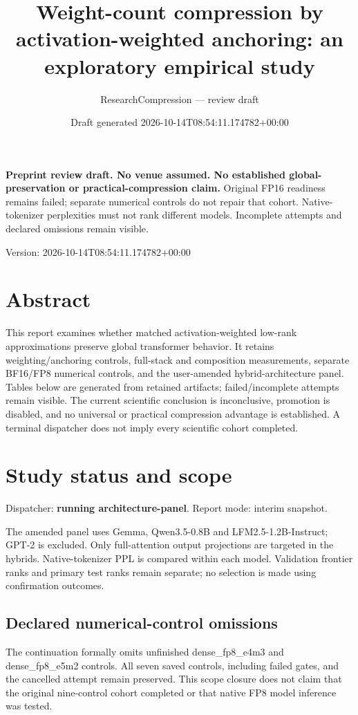 \documentclass[10pt]{article}
\title{Weight-count compression by activation-weighted anchoring: an exploratory empirical study}
\author{ResearchCompression --- review draft}
\date{Draft generated 2026-10-14T08:54:11.174782+00:00}
\begin{document}
\maketitle
\noindent\textbf{Preprint review draft. No venue assumed. No established global-preservation or practical-compression claim.}
Original FP16 readiness remains failed; separate numerical controls do not repair that cohort. Native-tokenizer perplexities must not rank different models. Incomplete attempts and declared omissions remain visible.


Version: 2026-10-14T08:54:11.174782+00:00

\section{Abstract}

This report examines whether matched activation-weighted low-rank approximations preserve global transformer behavior. It retains weighting/anchoring controls, full-stack and composition measurements, separate BF16/FP8 numerical controls, and the user-amended hybrid-architecture panel. Tables below are generated from retained artifacts; failed/incomplete attempts remain visible. The current scientific conclusion is inconclusive, promotion is disabled, and no universal or practical compression advantage is established. A terminal dispatcher does not imply every scientific cohort completed.

\section{Study status and scope}

Dispatcher: \textbf{running architecture-panel}. Report mode: interim snapshot.

The amended panel uses Gemma, Qwen3.5-0.8B and LFM2.5-1.2B-Instruct; GPT-2 is excluded. Only full-attention output projections are targeted in the hybrids. Native-tokenizer PPL is compared within each model. Validation frontier ranks and primary test ranks remain separate; no selection is made using confirmation outcomes.

\subsection{Declared numerical-control omissions}

The continuation formally omits unfinished dense\_fp8\_e4m3 and dense\_fp8\_e5m2 controls. All seven saved controls, including failed gates, and the cancelled attempt remain preserved. This scope closure does not claim that the original nine-control cohort completed or that native FP8 model inference was tested.
\end{document}
